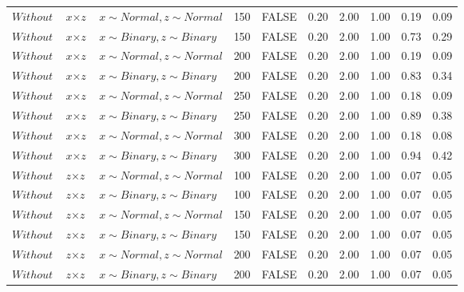 \begin{longtable}{lllrlrrrrr}
  $Without$ & $\textit{x} \times \textit{z}$ & $\textit{x} \sim Normal , \textit{z} \sim Normal$ & 150 & FALSE & 0.20 & 2.00 & 1.00 & 0.19 & 0.09 \\ 
  $Without$ & $\textit{x} \times \textit{z}$ & $\textit{x} \sim Binary, \textit{z} \sim Binary$ & 150 & FALSE & 0.20 & 2.00 & 1.00 & 0.73 & 0.29 \\ 
  $Without$ & $\textit{x} \times \textit{z}$ & $\textit{x} \sim Normal , \textit{z} \sim Normal$ & 200 & FALSE & 0.20 & 2.00 & 1.00 & 0.19 & 0.09 \\ 
  $Without$ & $\textit{x} \times \textit{z}$ & $\textit{x} \sim Binary, \textit{z} \sim Binary$ & 200 & FALSE & 0.20 & 2.00 & 1.00 & 0.83 & 0.34 \\ 
  $Without$ & $\textit{x} \times \textit{z}$ & $\textit{x} \sim Normal , \textit{z} \sim Normal$ & 250 & FALSE & 0.20 & 2.00 & 1.00 & 0.18 & 0.09 \\ 
  $Without$ & $\textit{x} \times \textit{z}$ & $\textit{x} \sim Binary, \textit{z} \sim Binary$ & 250 & FALSE & 0.20 & 2.00 & 1.00 & 0.89 & 0.38 \\ 
  $Without$ & $\textit{x} \times \textit{z}$ & $\textit{x} \sim Normal , \textit{z} \sim Normal$ & 300 & FALSE & 0.20 & 2.00 & 1.00 & 0.18 & 0.08 \\ 
  $Without$ & $\textit{x} \times \textit{z}$ & $\textit{x} \sim Binary, \textit{z} \sim Binary$ & 300 & FALSE & 0.20 & 2.00 & 1.00 & 0.94 & 0.42 \\ 
  $Without$ & $\textit{z} \times \textit{z}$ & $\textit{x} \sim Normal , \textit{z} \sim Normal$ & 100 & FALSE & 0.20 & 2.00 & 1.00 & 0.07 & 0.05 \\ 
  $Without$ & $\textit{z} \times \textit{z}$ & $\textit{x} \sim Binary, \textit{z} \sim Binary$ & 100 & FALSE & 0.20 & 2.00 & 1.00 & 0.07 & 0.05 \\ 
  $Without$ & $\textit{z} \times \textit{z}$ & $\textit{x} \sim Normal , \textit{z} \sim Normal$ & 150 & FALSE & 0.20 & 2.00 & 1.00 & 0.07 & 0.05 \\ 
  $Without$ & $\textit{z} \times \textit{z}$ & $\textit{x} \sim Binary, \textit{z} \sim Binary$ & 150 & FALSE & 0.20 & 2.00 & 1.00 & 0.07 & 0.05 \\ 
  $Without$ & $\textit{z} \times \textit{z}$ & $\textit{x} \sim Normal , \textit{z} \sim Normal$ & 200 & FALSE & 0.20 & 2.00 & 1.00 & 0.07 & 0.05 \\ 
  $Without$ & $\textit{z} \times \textit{z}$ & $\textit{x} \sim Binary, \textit{z} \sim Binary$ & 200 & FALSE & 0.20 & 2.00 & 1.00 & 0.07 & 0.05 \\ 

\end{longtable}
